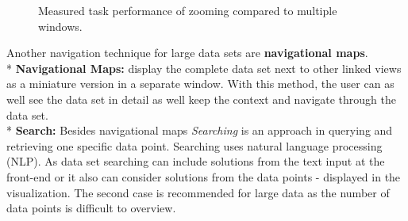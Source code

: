 \begin{figure}[H]
    \centering
    \caption{Measured task performance of zooming compared to multiple windows. \cite{Ware2012a}}
    \label{fig:my_label}
\end{figure}
Another navigation technique for large data sets are \textbf{navigational maps}.\\*
\textbf{Navigational Maps: } display the complete data set next to other linked views as a miniature version in a separate window. With this method, the user can as well see the data set in detail as well keep the context and navigate through the data set.\\*
\textbf{Search: } Besides navigational maps \textit{Searching} is an approach in querying and retrieving one specific data point. Searching uses natural language processing (NLP). As data set searching can include solutions from the text input at the front-end or it also can consider solutions from the data points - displayed in the visualization. The second case is recommended for large data as the number of data points is difficult to overview.
\par

